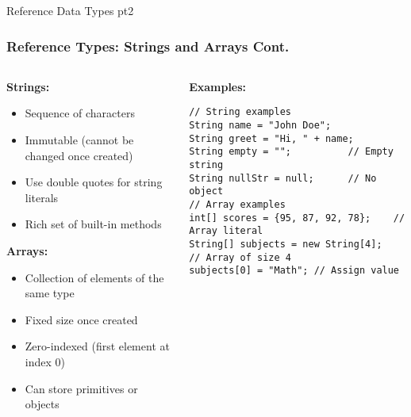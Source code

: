 \documentclass[aspectratio=169]{beamer}
\begin{document}
\begin{frame}[fragile]{Reference Data Types pt2}
    \frametitle{Reference Types: Strings and Arrays Cont. }
    \begin{columns}[t]
        \begin{column}{0.5\textwidth}
            \textbf{Strings:}
            \begin{itemize}
                \item Sequence of characters
                \item Immutable (cannot be changed once created)
                \item Use double quotes for string literals
                \item Rich set of built-in methods
            \end{itemize}
            
            \textbf{Arrays:}
            \begin{itemize}
                \item Collection of elements of the same type
                \item Fixed size once created
                \item Zero-indexed (first element at index 0)
                \item Can store primitives or objects
            \end{itemize}
        \end{column}
        
        \begin{column}{0.5\textwidth}
            \textbf{Examples:}
            \begin{lstlisting}
// String examples
String name = "John Doe";
String greet = "Hi, " + name;
String empty = "";          // Empty string
String nullStr = null;      // No object
// Array examples
int[] scores = {95, 87, 92, 78};    // Array literal
String[] subjects = new String[4];   // Array of size 4
subjects[0] = "Math"; // Assign value
            \end{lstlisting}
        \end{column}
    \end{columns}
\end{frame}
\end{document}
